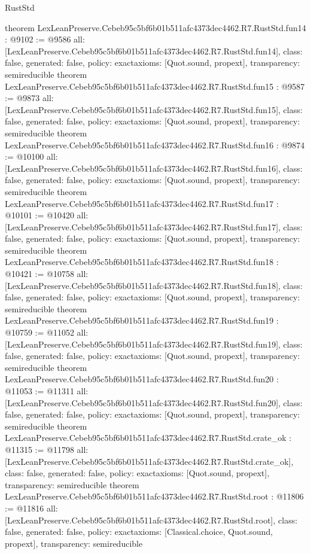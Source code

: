 \begin{lexlean}{RustStd}
\begin{coremodule}
{}
theorem LexLeanPreserve.Cebeb95c5bf6b01b511afc4373dec4462.R7.RustStd.fun14 : @9102 := @9586 {
  all: [LexLeanPreserve.Cebeb95c5bf6b01b511afc4373dec4462.R7.RustStd.fun14],
  class: false,
  generated: false,
  policy: exact{axioms: [Quot.sound, propext]},
  transparency: semireducible
}
theorem LexLeanPreserve.Cebeb95c5bf6b01b511afc4373dec4462.R7.RustStd.fun15 : @9587 := @9873 {
  all: [LexLeanPreserve.Cebeb95c5bf6b01b511afc4373dec4462.R7.RustStd.fun15],
  class: false,
  generated: false,
  policy: exact{axioms: [Quot.sound, propext]},
  transparency: semireducible
}
theorem LexLeanPreserve.Cebeb95c5bf6b01b511afc4373dec4462.R7.RustStd.fun16 : @9874 := @10100 {
  all: [LexLeanPreserve.Cebeb95c5bf6b01b511afc4373dec4462.R7.RustStd.fun16],
  class: false,
  generated: false,
  policy: exact{axioms: [Quot.sound, propext]},
  transparency: semireducible
}
theorem LexLeanPreserve.Cebeb95c5bf6b01b511afc4373dec4462.R7.RustStd.fun17 : @10101 := @10420 {
  all: [LexLeanPreserve.Cebeb95c5bf6b01b511afc4373dec4462.R7.RustStd.fun17],
  class: false,
  generated: false,
  policy: exact{axioms: [Quot.sound, propext]},
  transparency: semireducible
}
theorem LexLeanPreserve.Cebeb95c5bf6b01b511afc4373dec4462.R7.RustStd.fun18 : @10421 := @10758 {
  all: [LexLeanPreserve.Cebeb95c5bf6b01b511afc4373dec4462.R7.RustStd.fun18],
  class: false,
  generated: false,
  policy: exact{axioms: [Quot.sound, propext]},
  transparency: semireducible
}
theorem LexLeanPreserve.Cebeb95c5bf6b01b511afc4373dec4462.R7.RustStd.fun19 : @10759 := @11052 {
  all: [LexLeanPreserve.Cebeb95c5bf6b01b511afc4373dec4462.R7.RustStd.fun19],
  class: false,
  generated: false,
  policy: exact{axioms: [Quot.sound, propext]},
  transparency: semireducible
}
theorem LexLeanPreserve.Cebeb95c5bf6b01b511afc4373dec4462.R7.RustStd.fun20 : @11053 := @11311 {
  all: [LexLeanPreserve.Cebeb95c5bf6b01b511afc4373dec4462.R7.RustStd.fun20],
  class: false,
  generated: false,
  policy: exact{axioms: [Quot.sound, propext]},
  transparency: semireducible
}
theorem LexLeanPreserve.Cebeb95c5bf6b01b511afc4373dec4462.R7.RustStd.crate_ok : @11315 := @11798 {
  all: [LexLeanPreserve.Cebeb95c5bf6b01b511afc4373dec4462.R7.RustStd.crate_ok],
  class: false,
  generated: false,
  policy: exact{axioms: [Quot.sound, propext]},
  transparency: semireducible
}
theorem LexLeanPreserve.Cebeb95c5bf6b01b511afc4373dec4462.R7.RustStd.root : @11806 := @11816 {
  all: [LexLeanPreserve.Cebeb95c5bf6b01b511afc4373dec4462.R7.RustStd.root],
  class: false,
  generated: false,
  policy: exact{axioms: [Classical.choice, Quot.sound, propext]},
  transparency: semireducible
}


\end{coremodule}
\end{lexlean}
